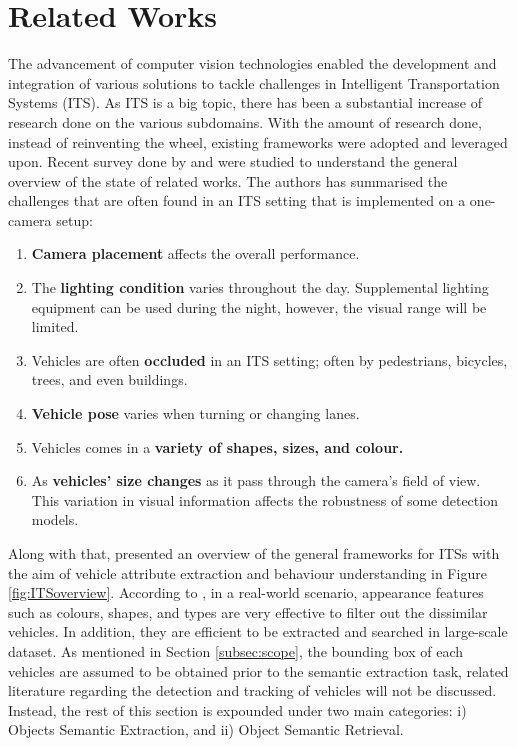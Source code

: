 \section{Related Works}
\label{section:relatedworks}

The advancement of computer vision technologies enabled the development and integration of various solutions to tackle challenges in Intelligent Transportation Systems (ITS). As ITS is a big topic, there has been a substantial increase of research done on the various subdomains. With the amount of research done, instead of reinventing the wheel, existing frameworks were adopted and leveraged upon. Recent survey done by  and  were studied to understand the general overview of the state of related works. The authors has summarised the challenges that are often found in an ITS setting that is implemented on a one-camera setup: 
\begin{enumerate}
    \item \textbf{Camera placement} affects the overall performance. 
    \item The \textbf{lighting condition} varies throughout the day. Supplemental lighting equipment can be used during the night, however, the visual range will be limited.
    \item Vehicles are often \textbf{occluded} in an ITS setting; often by pedestrians, bicycles, trees, and even buildings.
    \item \textbf{Vehicle pose} varies when turning or changing lanes.
    \item Vehicles comes in a \textbf{variety of shapes, sizes, and colour.}
    \item As \textbf{vehicles' size changes} as it pass through the camera's field of view. This variation in visual information affects the robustness of some detection models. 
\end{enumerate}
Along with that,  presented an overview of the general frameworks for ITSs with the aim of vehicle attribute extraction and behaviour understanding in Figure \ref{fig:ITSoverview}. According to , in a real-world scenario, appearance features such as colours, shapes, and types are very effective to filter out the dissimilar vehicles. In addition, they are efficient to be extracted and searched in large-scale dataset. 
As mentioned in Section \ref{subsec:scope}, the bounding box of each vehicles are assumed to be obtained prior to the semantic extraction task, related literature regarding the detection and tracking of vehicles will not be discussed. 
Instead, the rest of this section is expounded under two main categories: i) Objects Semantic Extraction, and ii) Object Semantic Retrieval. 


